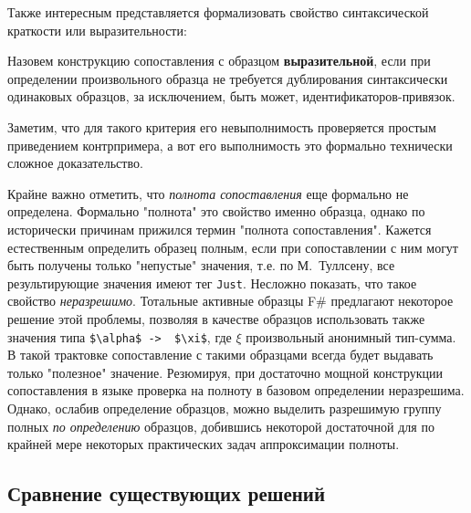Также интересным представляется формализовать свойство синтаксической краткости или выразительности:

\begin{definition}[Выразительность]
Назовем конструкцию сопоставления с образцом \textbf{выразительной}, если при определении произвольного образца не требуется дублирования синтаксически одинаковых образцов, за исключением, быть может, идентификаторов-привязок.
\end{definition}

Заметим, что для такого критерия его невыполнимость проверяется простым приведением контрпримера, а вот его выполнимость это формально технически сложное доказательство.

Крайне важно отметить, что \textit{полнота сопоставления} еще формально не определена. Формально "полнота" это свойство именно образца, однако по исторически причинам прижился термин "полнота сопоставления". Кажется естественным определить образец полным, если при сопоставлении с ним могут быть получены только "непустые" значения, т.е. по М.~Туллсену, все результирующие значения имеют тег \lstinline|Just|. Несложно показать, что такое свойство \textit{неразрешимо}. Тотальные активные образцы F\# предлагают некоторое решение этой проблемы, позволяя в качестве образцов использовать также значения типа \lstinline|$\alpha$ ->  $\xi$|, где $\xi$ произвольный анонимный тип-сумма. В такой трактовке сопоставление с такими образцами всегда будет выдавать только "полезное" значение. Резюмируя, при достаточно мощной конструкции сопоставления в языке проверка на полноту в базовом определении неразрешима. Однако, ослабив определение образцов, можно выделить разрешимую группу полных \textit{по определению} образцов, добившись некоторой достаточной для по крайней мере некоторых практических задач аппроксимации полноты.


\subsection{Сравнение существующих решений}


